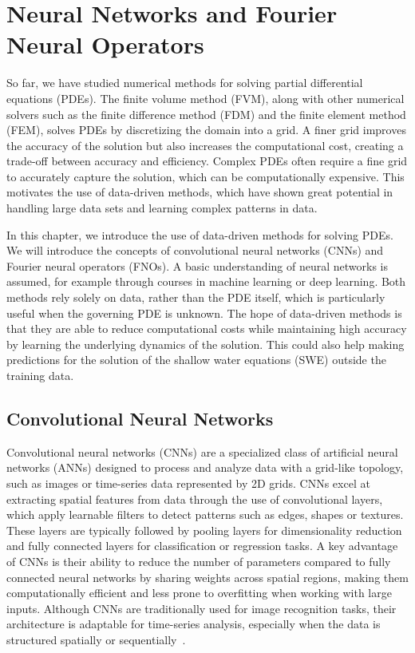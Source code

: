 \chapter{Neural Networks and Fourier Neural Operators}\label{ch:FNO+NN}
So far, we have studied numerical methods for solving partial differential equations (PDEs).
The finite volume method (FVM), along with other numerical solvers such as the finite difference method (FDM) and the finite element method (FEM), solves PDEs by discretizing the domain into a grid.
A finer grid improves the accuracy of the solution but also increases the computational cost, creating a trade-off between accuracy and efficiency.
Complex PDEs often require a fine grid to accurately capture the solution, which can be computationally expensive.
This motivates the use of data-driven methods, which have shown great potential in handling large data sets and learning complex patterns in data.

In this chapter, we introduce the use of data-driven methods for solving PDEs.
We will introduce the concepts of convolutional neural networks (CNNs) and Fourier neural operators (FNOs).
A basic understanding of neural networks is assumed, for example through courses in machine learning or deep learning.
Both methods rely solely on data, rather than the PDE itself, which is particularly useful when the governing PDE is unknown.
The hope of data-driven methods is that they are able to reduce computational costs while maintaining high accuracy by learning the underlying dynamics of the solution.
This could also help making predictions for the solution of the shallow water equations (SWE) outside the training data.


\section{Convolutional Neural Networks}\label{sec:CNN}
Convolutional neural networks (CNNs) are a specialized class of artificial neural networks (ANNs) designed to process and analyze data with a grid-like topology, such as images or time-series data represented by 2D grids.
CNNs excel at extracting spatial features from data through the use of convolutional layers, which apply learnable filters to detect patterns such as edges, shapes or textures.
These layers are typically followed by pooling layers for dimensionality reduction and fully connected layers for classification or regression tasks.
A key advantage of CNNs is their ability to reduce the number of parameters compared to fully connected neural networks by sharing weights across spatial regions, making them computationally efficient and less prone to overfitting when working with large inputs.
Although CNNs are traditionally used for image recognition tasks, their architecture is adaptable for time-series analysis, especially when the data is structured spatially or sequentially~\cite{chollet2017comprehensive}.

